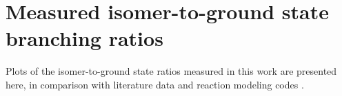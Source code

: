 % 
% 
% 


% 


% 
% 
\section{Measured isomer-to-ground state branching ratios } \label{sec:fe_ibr_figures}

Plots of the isomer-to-ground state ratios measured in this work are presented here, in comparison with literature data and reaction modeling codes 
\cite{Michel1978,Kopecky1993,Zarie2006a,Khandaker2009}.



